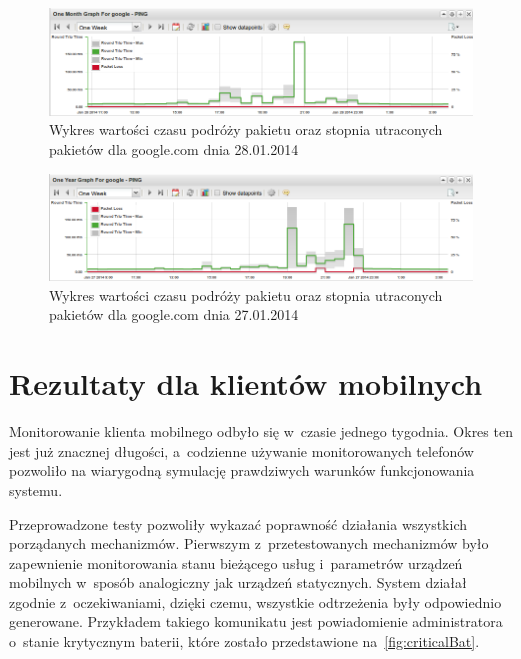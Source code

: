 \begin{figure}[H]
  \caption{Wykres wartości czasu podróży pakietu oraz stopnia
    utraconych pakietów dla google.com dnia 28.01.2014}
  \label{fig:google2801}
  \centering
\includegraphics[width=1\textwidth]{img/google2801.png}
\end{figure}

\begin{figure}[H]
  \caption{Wykres wartości czasu podróży pakietu oraz stopnia
    utraconych pakietów dla google.com dnia 27.01.2014}
  \label{fig:google2701}
  \centering
\includegraphics[width=1\textwidth]{img/google2701.png}
\end{figure}


\section[Klient mobilny][Rezultaty dla klientów mobilnych]{Rezultaty dla klientów mobilnych}

Monitorowanie klienta mobilnego odbyło się w~czasie jednego
tygodnia. Okres ten jest już znacznej długości, a~codzienne używanie
monitorowanych telefonów pozwoliło na wiarygodną symulację prawdziwych
warunków funkcjonowania systemu.

Przeprowadzone testy pozwoliły wykazać poprawność działania wszystkich
porządanych mechanizmów. Pierwszym z~przetestowanych mechanizmów było
zapewnienie monitorowania stanu bieżącego usług i~parametrów urządzeń
mobilnych w~sposób analogiczny jak urządzeń statycznych. System
działał zgodnie z~oczekiwaniami, dzięki czemu, wszystkie odtrzeżenia
były odpowiednio generowane. Przykładem takiego komunikatu jest
powiadomienie administratora o~stanie krytycznym baterii, które
zostało przedstawione na~\ref{fig:criticalBat}.


